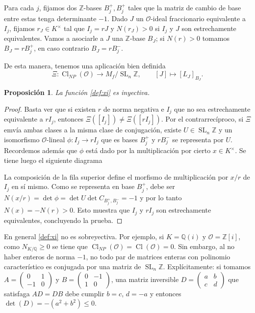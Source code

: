 \documentclass[11pt,a4paper]{amsart}
\newcommand{\Q}{\mathbb{Q}}
\newcommand{\Z}{\mathbb{Z}}
\DeclareMathOperator{\SL}{SL}
\DeclareMathOperator{\CL}{Cl}
\numberwithin{equation}{section}
\theoremstyle{plain}
\newtheorem{prop}[equation]{Proposición}
\renewcommand{\O}{\mathcal{O}}
\begin{document}
Para cada $j$, fijamos dos $\Z$-bases $B^+_j, B^+_j$ tales que
la matriz de cambio de base entre estas tenga determinante $-1$.
Dado $J$ un $\O$-ideal fraccionario equivalente a $I_j$, fijamos
$r_J \in K^\times$ tal que $I_j = rJ$ y $N(r_J) > 0$ si $I_j$ y $J$
son estrechamente equivalentes. Vamos a asociarle a $J$ una $\Z$-base $B_J$;
si $N(r)>0$ tomamos $B_J = rB_j^+$, en caso contrario $B_J = rB_j^-$.

De esta manera, tenemos una aplicación bien definida
\begin{equation}\label{def:xi}
  \Xi \colon \CL_{NP}(\O) \to M_f/\SL_n \Z, \qquad [J] \mapsto [L_{J}]_{B_J}.
\end{equation}

\begin{prop} La función \eqref{def:xi} es inyectiva.
\end{prop}
\begin{proof}Basta ver que si existen $r$ de
norma negativa e $I_j$ que no sea estrechamente
equivalente a $r I_j$, entonces $\Xi([I_j])
\neq \Xi([rI_j])$. Por el contrarrecíproco,
si $\Xi$ emvía ambas clases a la misma clase de conjugación,
existe $U \in \SL_n \Z$ y un isomorfismo $\O$-lineal
$\phi \colon I_j \to r I_j$ que es bases $B_j^+$ y $r B_j^-$
se representa por $U$. Recordemos además que $\phi$
está dado por la multiplicación por cierto $x \in K^\times$.
Se tiene luego el siguiente diagrama
\begin{center}
\end{center}
La composición de la fila superior define el morfismo de multiplicación por
$x/r$ de $I_j$ en sí mismo. Como se representa en base $B_j^+$, debe ser
$N(x/r) = \det \phi = \det U \det C_{B_j^+, B_j^-} = -1$ y por lo
tanto $N(x) = -N(r) > 0$. Esto muestra que $I_j$ y $rI_j$ son estrechamente
equivalentes, concluyendo la prueba.
\end{proof}

En general \eqref{def:xi} no es sobreyectiva. Por ejemplo,
si $K = \Q(i)$ y $\O = \Z[i]$, como $N_{K/\Q} \ge 0$
se tiene que $\CL_{NP}(\O) = \CL(\O) = 0$. Sin embargo,
al no haber enteros de norma $-1$, no todo par de matrices enteras
con polinomio característico es conjugada por una matriz de $\SL_n \Z$.
Explícitamente: si tomamos $A = \begin{pmatrix}
0 & 1\\-1 & 0\end{pmatrix}$ y $B = \begin{pmatrix}
0 & -1 \\ 1 & 0\end{pmatrix}$, una matriz inversible $D =
\begin{pmatrix} a & b \\ c & d\end{pmatrix}$
que satisfaga $AD = DB$ debe cumplir $b =c$, $d =-a$ y
entonces $\det(D) = -(a^2+b^2) \le 0$.
\end{document}
